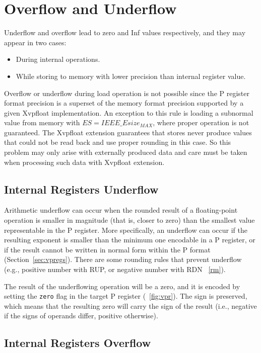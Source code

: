 \section{Overflow and Underflow}

Underflow and overflow lead to zero and Inf values respectively, and they may appear in two cases:
\begin{itemize}
    \item During internal operations.
    \item While storing to memory with lower precision than internal register value.
\end{itemize}

Overflow or underflow during load operation is not possible since the P register format precision is a superset of the memory format precision supported by a given Xvpfloat implementation.
An exception to this rule is loading a subnormal value from memory with $ES = IEEE\_Esize_{MAX}$, where proper operation is not guaranteed.
The Xvpfloat extension guarantees that stores never produce values that could not be read back and use proper rounding in this case.
So this problem may only arise with externally produced data and care must be taken when processing such data with Xvpfloat extension.

\subsection{Internal Registers Underflow}

Arithmetic underflow can occur when the rounded result of a floating-point operation is smaller in magnitude (that is, closer to zero) than the smallest value representable in the P register.
More specifically, an underflow can occur if the resulting exponent is smaller than the minimum one encodable in a P register, or if the result cannot be written in normal form within the P format (Section~\ref{sec:vpregs}).
There are some rounding rules that prevent underflow (e.g., positive number with RUP, or negative number with RDN \figurename~\ref{rm}).

The result of the underflowing operation will be a zero, and it is encoded by setting the \texttt{zero} flag in the target P register (\figurename~\ref{fig:vpr}).
The sign is preserved, which means that the resulting zero will carry the sign of the result (i.e., negative if the signs of operands differ, positive otherwise).

\subsection{Internal Registers Overflow}

